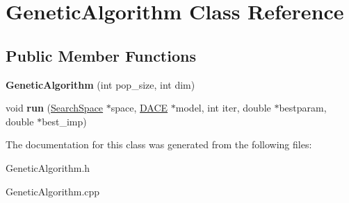 \hypertarget{class_genetic_algorithm}{}\section{Genetic\+Algorithm Class Reference}
\label{class_genetic_algorithm}
\subsection*{Public Member Functions}
\begin{DoxyCompactItemize}
\item 
\hypertarget{class_genetic_algorithm_a4dcf6881934bdbc7ec8e14d00cf11eae}{}{\bfseries Genetic\+Algorithm} (int pop\+\_\+size, int dim)\label{class_genetic_algorithm_a4dcf6881934bdbc7ec8e14d00cf11eae}

\item 
\hypertarget{class_genetic_algorithm_af87c64ea7cea76a1716b832a4d57b998}{}void {\bfseries run} (\hyperlink{class_search_space}{Search\+Space} $\ast$space, \hyperlink{class_d_a_c_e}{D\+A\+C\+E} $\ast$model, int iter, double $\ast$bestparam, double $\ast$best\+\_\+imp)\label{class_genetic_algorithm_af87c64ea7cea76a1716b832a4d57b998}

\end{DoxyCompactItemize}


The documentation for this class was generated from the following files\+:\begin{DoxyCompactItemize}
\item 
Genetic\+Algorithm.\+h\item 
Genetic\+Algorithm.\+cpp\end{DoxyCompactItemize}
